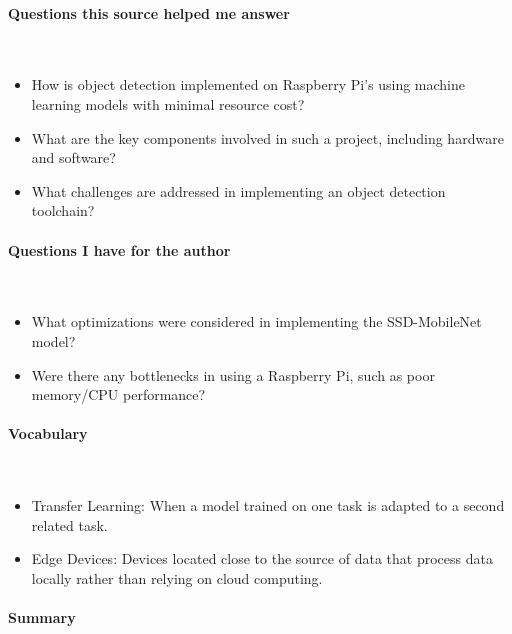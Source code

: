 \vspace*{-0.5cm}
\paragraph{Questions this source helped me answer} \

\begin{itemize}
    \item How is object detection implemented on Raspberry Pi's using machine learning models with minimal resource cost?
    \item What are the key components involved in such a project, including hardware and software?
    \item What challenges are addressed in implementing an object detection toolchain?   
\end{itemize}

\vspace*{-0.5cm}
\paragraph{Questions I have for the author} \ 

\begin{itemize}
    \item What optimizations were considered in implementing the SSD-MobileNet model?
    \item Were there any bottlenecks in using a Raspberry Pi, such as poor memory/CPU performance?
\end{itemize}

\vspace{-0.5cm}
\paragraph{Vocabulary} \ 

\begin{itemize}
\item Transfer Learning: When a model trained on one task is adapted to a second related task.
\item Edge Devices: Devices located close to the source of data that process data locally rather than relying on cloud computing.
\end{itemize}

\vspace*{-0.5cm}
\paragraph{Summary} \

